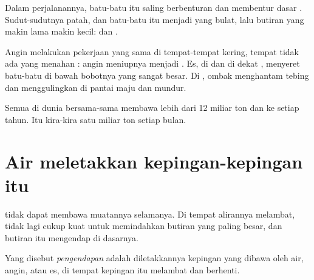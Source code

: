 Dalam perjalanannya, batu-batu itu saling berbenturan dan membentur dasar
. Sudut-sudutnya patah, dan batu-batu itu menjadi  yang bulat,
lalu butiran yang makin lama makin kecil:  dan .

Angin melakukan pekerjaan yang sama di tempat-tempat kering, tempat tidak
ada yang menahan : angin meniupnya menjadi  . Es, di
 dan di dekat , menyeret batu-batu di bawah bobotnya yang
sangat besar. Di , ombak menghantam tebing dan menggulingkan 
di pantai maju dan mundur.

\begin{remark}\label{rem:g5:water-shapes-the-land:how-much}
Semua  di dunia bersama-sama membawa lebih dari 12 miliar ton 
dan  ke  setiap tahun. Itu kira-kira satu miliar ton setiap bulan.
\end{remark}

\section{Air meletakkan kepingan-kepingan itu}

 tidak dapat membawa muatannya selamanya. Di tempat alirannya
melambat,  tidak lagi cukup kuat untuk memindahkan butiran yang
paling besar, dan butiran itu mengendap di dasarnya.

\begin{definition}[Pengendapan]\label{def:g5:water-shapes-the-land:deposition}
Yang disebut \emph{pengendapan} adalah diletakkannya
kepingan  yang dibawa oleh air, angin, atau es, di tempat kepingan itu
melambat dan berhenti.
\end{definition}

